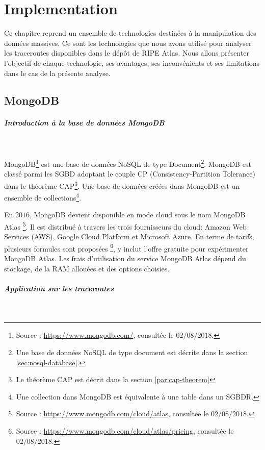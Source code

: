 \chapter{Implementation}

Ce chapitre reprend un ensemble de   technologies destinées  à la manipulation des données massives. Ce sont les technologies que nous avons utilisé pour analyser les traceroutes disponibles dans le dépôt de RIPE Atlas. Nous allons présenter l'objectif de chaque technologie, ses avantages, ses inconvénients et ses limitations dans le cas de la présente analyse.


\section{MongoDB}


\paragraph{Introduction à la base de données MongoDB} \label{subsubsection:mongodb}~

MongoDB\footnote{Source : \url{https://www.mongodb.com/}, consultée le $02/08/2018$.} est une base de données  NoSQL de type Document\footnote{Une base de données NoSQL de type document est décrite dans la section \ref{sec:nosql-database}.}.  MongoDB est classé parmi les  SGBD adoptant le couple CP (Consistency-Partition Tolerance) dans le théorème  CAP\footnote{Le théorème  CAP est décrit dans la section \ref{par:cap-theorem}}. Une base de données créées dans MongoDB est un ensemble de collections\footnote{Une collection dans MongoDB est équivalente à une table dans un SGBDR.}.

En $ 2016 $, MongoDB devient disponible en mode cloud sous le nom  MongoDB Atlas \footnote{Source : \url{https://www.mongodb.com/cloud/atlas}, consultée le $ 02/08/2018 $.}.  Il est distribué à travers les trois fournisseurs du cloud: Amazon Web Services (AWS), Google Cloud Platform et Microsoft Azure.  En terme de tarifs, plusieurs formules sont proposées \footnote{Source : \url{https://www.mongodb.com/cloud/atlas/pricing}, consultée le $ 02/08/2018 $.}, y inclut l'offre gratuite pour expérimenter MongoDB Atlas.  Les frais d'utilisation du service MongoDB Atlas dépend du stockage, de la  RAM allouées et des options choisies.

\paragraph{Application sur les  traceroutes }~

